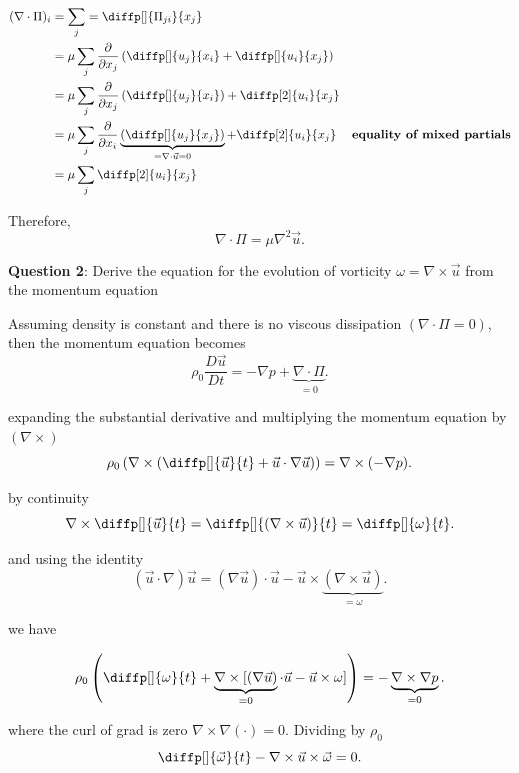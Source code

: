 \begin{align*}
  (\nabla \cdot \Pi)_{i} &= \sum_{j} = \diffp[]{ \Pi_{ji}}{x_{j}} \\
                         &= \mu \sum_{j}\frac{\partial}{\partial x_{j}} \left(
                         \diffp[]{u_{j}}{x_{i}} + \diffp[]{u_{i}}{x_{j}}\right)
                         \\
                         &= \mu\sum_{j} \frac{\partial}{\partial x_{j}} \left(
                         \diffp[]{u_{j}}{x_{i}}\right)
                         + \diffp[2]{u_{i}}{x_{j}} \\
                         &= \mu\sum_{j} \frac{\partial}{\partial x_{i}}
                         \underbrace{\left( \diffp[]{u_{j}}{x_{j}}\right)}_{=
                         \nabla \cdot \vec{u} = 0}
  + \diffp[2]{u_{i}}{x_{j}} & \textbf{equality of mixed partials}\\
                            &= \mu \sum_{j}\diffp[2]{u_{i}}{x_{j}}
\end{align*}

Therefore,
\[
  \boxed{\nabla \cdot \Pi = \mu \nabla^{2} \vec{u}}
.\] 

\textbf{Question 2}: Derive the equation for the evolution of vorticity
$ \omega = \nabla \times \vec{u}$ from the momentum equation 

Assuming density is constant and there is no viscous dissipation $ (\nabla
\cdot\Pi = 0)$, then the momentum equation becomes
\[
  \rho_0 \frac{D\vec{u}}{Dt} = - \nabla p + \underbrace{\nabla
  \cdot\Pi}_{=0}
.\] 

expanding the substantial derivative and multiplying the momentum equation by
$( \nabla\times)$
\[
  \rho_0\left(\nabla\times \left( \diffp[]{\vec{u}}{t} + \vec{u} \cdot
  \nabla\vec{u}\right)\right) = \nabla\times (- \nabla p)
.\] 

by continuity 
\[
  \nabla\times \diffp[]{\vec{u}}{t} = \diffp[]{ (\nabla\times
  \vec{u})}{t} = \diffp[]{ \omega}{t}
.\] 

and using the identity 
\[
(\vec{u} \cdot \nabla)\vec{u}
= (\nabla\vec{u}) \cdot\vec{u} - \vec{u}\times \underbrace{
(\nabla\times\vec{u})}_{= \omega}
.\] 

we have

\[
  \rho_0 \left( \diffp[]{ \omega}{t}
    + \underbrace{\nabla\times[(\nabla\vec{u})}_{=0} \cdot\vec{u} - \vec{u}\times \omega ]\right) = -\underbrace{\nabla\times
\nabla p}_{=0}
.\] 

where the curl of grad is zero $ \nabla\times \nabla ( \cdot) = 0$. Dividing by
$ \rho_0$ 
\[
\diffp[]{ \vec{ \omega}}{t} - \nabla\times\vec{u}\times \vec{ \omega} = 0
.\] 

